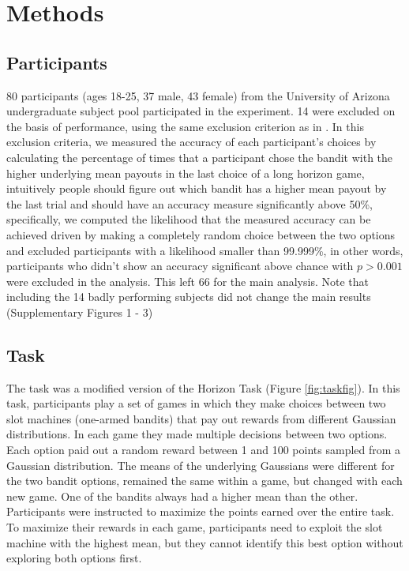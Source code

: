 \documentclass[12pt]{article}
\begin{document}
	
		\section*{Methods}
	\subsection*{Participants}
	
	80 participants (ages 18-25, 37 male, 43 female) from the University of Arizona undergraduate subject pool participated in the experiment. 14 were excluded on the basis of performance, using the same exclusion criterion as in \citep{wilson2014}. In this exclusion criteria, we measured the accuracy of each participant's choices by calculating the percentage of times that a participant chose the bandit with the higher underlying mean payouts in the last choice of a long horizon game, intuitively people should figure out which bandit has a higher mean payout by the last trial and should have an accuracy measure significantly above 50\%, specifically, we computed the likelihood that the measured accuracy can be achieved driven by making a completely random choice between the two options and excluded participants with a likelihood smaller than 99.999\%, in other words, participants who didn't show an accuracy significant above chance with $p > 0.001$ were excluded in the analysis. This left 66 for the main analysis. Note that including the 14 badly performing subjects did not change the main results (Supplementary Figures 1 - 3)%
	
	\subsection*{Task}
	The task was a modified version of the Horizon Task \citep{wilson2014} (Figure \ref{fig:taskfig}). In this task, participants play a set of games in which they make choices between two slot machines (one-armed bandits) that pay out rewards from different Gaussian distributions. In each game they made multiple decisions between two options. Each option paid out a random reward between 1 and 100 points sampled from a Gaussian distribution. The means of the underlying Gaussians were different for the two bandit options, remained the same within a game, but changed with each new game. One of the bandits always had a higher mean than the other. Participants were instructed to maximize the points earned over the entire task. To maximize their rewards in each game, participants need to exploit the slot machine with the highest mean, but they cannot identify this best option without exploring both options first. 
	
\end{document}
